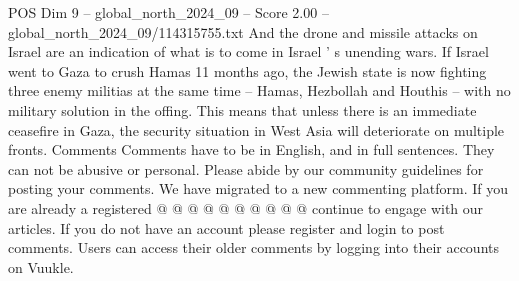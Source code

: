 \begin{textsample}{POS Dim 9 – global\_north\_2024\_09 – Score 2.00 – global\_north\_2024\_09/114315755.txt}
And the drone and missile attacks on Israel are an indication of what is to come in Israel ' s unending wars.
If Israel went to Gaza to crush Hamas 11 months ago, the Jewish state is now fighting three enemy militias at the same time -- Hamas, Hezbollah and Houthis -- with no military solution in the offing.
This means that unless there is an immediate ceasefire in Gaza, the security situation in West Asia will deteriorate on multiple fronts.
Comments Comments have to be in English, and in full sentences.
They can not be abusive or personal.
Please abide by our community guidelines for posting your comments.
We have migrated to a new commenting platform.
If you are already a registered @ @ @ @ @ @ @ @ @ @ continue to engage with our articles.
If you do not have an account please register and login to post comments.
Users can access their older comments by logging into their accounts on Vuukle.

\end{textsample}
